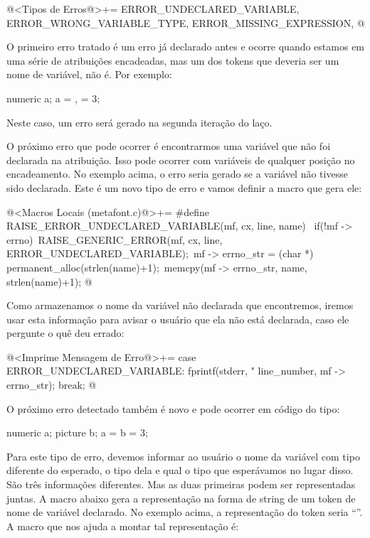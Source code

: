 \iniciocodigo
@<Tipos de Erros@>+=
ERROR_UNDECLARED_VARIABLE, ERROR_WRONG_VARIABLE_TYPE, ERROR_MISSING_EXPRESSION,
@
\fimcodigo

O primeiro erro tratado é um erro já declarado antes e ocorre quando
estamos em uma série de atribuições encadeadas, mas um dos tokens que
deveria ser um nome de variável, não é. Por exemplo:

\alinhaverbatim
numeric a;
a = , = 3; %
\alinhanormal

Neste caso, um erro será gerado na segunda iteração do laço.

O próximo erro que pode ocorrer é encontrarmos uma variável que não
foi declarada na atribuição. Isso pode ocorrer com variáveis de
qualquer posição no encadeamento. No exemplo acima, o erro seria
gerado se a variável  não tivesse sido declarada. Este é
um novo tipo de erro e vamos definir a macro que gera ele:

\iniciocodigo
@<Macros Locais (metafont.c)@>+=
#define RAISE_ERROR_UNDECLARED_VARIABLE(mf, cx, line, name) {\
  if(!mf -> errno){\
    RAISE_GENERIC_ERROR(mf, cx, line, ERROR_UNDECLARED_VARIABLE);\
    mf -> errno_str = (char *) permanent_alloc(strlen(name)+1);\
    memcpy(mf -> errno_str, name, strlen(name)+1);}}
@
\fimcodigo

Como armazenamos o nome da variável não declarada que encontremos,
iremos usar esta informação para avisar o usuário que ela não está
declarada, caso ele pergunte o quê deu errado:

\iniciocodigo
@<Imprime Mensagem de Erro@>+=
case ERROR_UNDECLARED_VARIABLE:
  fprintf(stderr, "%
          line_number, mf -> errno_str);
  break;
@
\fimcodigo

O próximo erro detectado também é novo e pode ocorrer em código do
tipo:

\alinhaverbatim
numeric a;
picture b;
a = b = 3; %
\alinhanormal

Para este tipo de erro, devemos informar ao usuário o nome da variável
com tipo diferente do esperado, o tipo dela e qual o tipo que
esperávamos no lugar disso. São três informações diferentes. Mas as
duas primeiras podem ser representadas juntas. A macro abaixo gera a
representação na forma de string de um token de nome de variável
declarado. No exemplo acima, a representação do token 
seria ``\monoespaco{<b:picture>}''. A macro que nos ajuda a montar tal
representação é:

